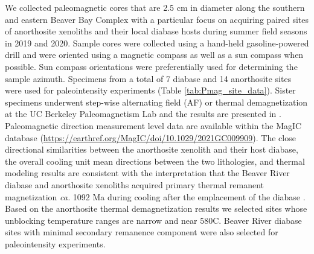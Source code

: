 \documentclass[draft]{agujournal2019}
\begin{document}
We collected paleomagnetic cores that are 2.5 cm in diameter along the southern and eastern Beaver Bay Complex with a particular focus on acquiring paired sites of anorthosite xenoliths and their local diabase hosts during summer field seasons in 2019 and 2020. Sample cores were collected using a hand-held gasoline-powered drill and were oriented using a magnetic compass as well as a sun compass when possible. Sun compass orientations were preferentially used for determining the sample azimuth. Specimens from a total of 7 diabase and 14 anorthosite sites were used for paleointensity experiments (Table \ref{tab:Pmag_site_data}). Sister specimens underwent step-wise alternating field (AF) or thermal demagnetization at the UC Berkeley Paleomagnetism Lab and the results are presented in . Paleomagnetic direction measurement level data are available within the MagIC database (\url{https://earthref.org/MagIC/doi/10.1029/2021GC009909}). The close directional similarities between the anorthosite xenolith and their host diabase, the overall cooling unit mean directions between the two lithologies, and thermal modeling results are consistent with the interpretation that the Beaver River diabase and anorthosite xenoliths acquired primary thermal remanent magnetization \textit{ca.} 1092 Ma during cooling after the emplacement of the diabase \cite{Zhang2021b}. Based on the anorthosite thermal demagnetization results we selected sites whose unblocking temperature ranges are narrow and near 580\textdegree C. Beaver River diabase sites with minimal secondary remanence component were also selected for paleointensity experiments.
\end{document}
